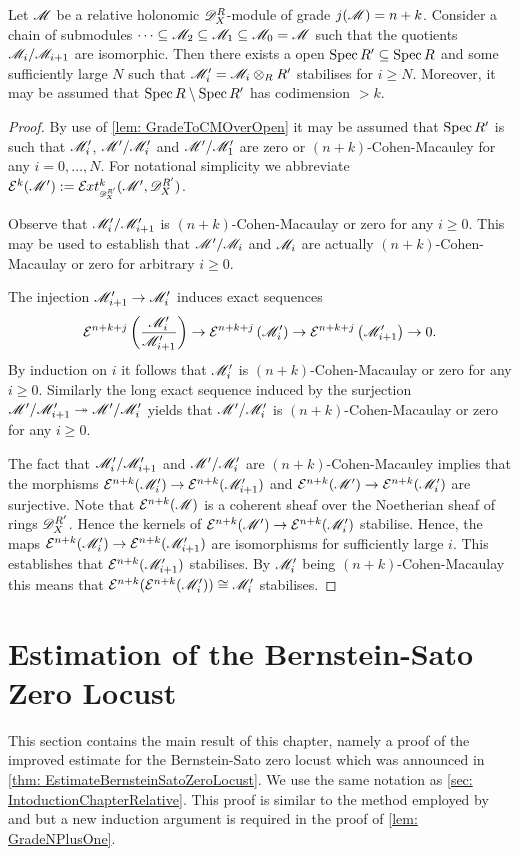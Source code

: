 \begin{lemma}\label{lem: StabilisationChains}
  Let $\mathscr{M}$ be a relative holonomic $\mathscr{D}_X^R$-module of grade $j(\mathscr{M}) = n+k$.
  Consider a chain of submodules $\cdots \subseteq \mathscr{M}_2\subseteq\mathscr{M}_1 \subseteq \mathscr{M}_0 = \mathscr{M} $
  such that the quotients $\mathscr{M}_i/\mathscr{M}_{i+1}$ are isomorphic.
  Then there exists a open $\operatorname{Spec} R' \subseteq \operatorname{Spec} R$ and some sufficiently large $N$ such that $\mathscr{M}_i' = \mathscr{M}_i\otimes_R R'$ stabilises for $i\geq N$. Moreover, it may be assumed that $\operatorname{Spec} R \setminus \operatorname{Spec} R'$ has codimension $>k$.
\end{lemma}
\begin{proof}
  By use of \cref{lem: GradeToCMOverOpen} it may be assumed that $\operatorname{Spec} R'$ is such that $\mathscr{M}_i'$, $\mathscr{M}'/\mathscr{M}_i'$ and $\mathscr{M}'/\mathscr{M}_1'$ are zero or $(n+k)$-Cohen-Macauley for any $i=0,\ldots,N$.
  For notational simplicity we abbreviate $\E^{k}(\M') :=\Ex{\D_X^{R'}}{k}(\M',\D_X^{R'})$.

  Observe that $ \mathscr{M}_i'/\mathscr{M}_{i+1}'$ is $(n+k)$-Cohen-Macaulay or zero for any $i\geq 0$.
  This may be used to establish that $\mathscr{M}'/\mathscr{M}_i$ and $\mathscr{M}_i$ are actually $(n+k)$-Cohen-Macaulay or zero for arbitrary $i\geq 0$.

  The injection $ \mathscr{M}_{i+1}'\to \mathscr{M}_i'$ induces exact sequences
  $$\mathcal{E}^{n+k+j}\left(\frac{\mathscr{M}_i'}{ \mathscr{M}_{i+1}'}\right) \to  \mathcal{E}^{n+k+j}\left(\mathscr{M}_i'\right) \to \mathcal{E}^{n+k +j}\left( \mathscr{M}_{i+1}'\right)\to 0.$$
  By induction on $i$ it follows that $\mathscr{M}_i'$ is $(n+k)$-Cohen-Macaulay or zero for any $i\geq 0$.
  Similarly the long exact sequence induced by the surjection $\mathscr{M}'/\mathscr{M}_{i+1}' \twoheadrightarrow \mathscr{M}'/\mathscr{M}_i'$ yields that $\mathscr{M}'/\mathscr{M}_i'$ is $(n+k)$-Cohen-Macaulay or zero for any $i\geq 0$.


  The fact that $\mathscr{M}_i'/\mathscr{M}_{i+1}'$ and $\mathscr{M}'/\mathscr{M}_{i}'$ are $(n+k)$-Cohen-Macauley implies that the morphisms $\mathcal{E}^{n+k}(\mathscr{M}_i') \to  \mathcal{E}^{n+k}(\mathscr{M}_{i+1}')$ and $\mathcal{E}^{n+k}(\mathscr{M}') \to \mathcal{E}^{n+k} (\mathscr{M}_i')$ are surjective.
  Note that $\mathcal{E}^{n+k}(\mathscr{M})$ is a coherent sheaf over the Noetherian sheaf of rings $\mathscr{D}_X^{R'}$.
  Hence the kernels of $\mathcal{E}^{n+k}(\mathscr{M}') \to \mathcal{E}^{n+k} (\mathscr{M}_i')$ stabilise.
  Hence, the maps $\mathcal{E}^{n+k}(\mathscr{M}_i') \to  \mathcal{E}^{n+k}(\mathscr{M}_{i+1}')$ are isomorphisms for sufficiently large $i$.
  This establishes that $\mathcal{E}^{n+k}(\mathscr{M}_{i+1}')$ stabilises.
  By $ \mathscr{M}_i'$ being $(n+k)$-Cohen-Macaulay this means that $\mathcal{E}^{n+k}(\mathcal{E}^{n+k}(\mathscr{M}_i')) \cong \mathscr{M}_i'$ stabilises.
\end{proof}
\section{Estimation of the Bernstein-Sato Zero Locust}
This section contains the main result of this chapter, namely a proof of the improved estimate for the Bernstein-Sato zero locust which was announced in \cref{thm: EstimateBernsteinSatoZeroLocust}.
We use the same notation as \cref{sec: IntoductionChapterRelative}.
This proof is similar to the method employed by \cite{lichtin1989poles} and \cite{kashiwara1976b} but a new induction argument is required in the proof of \cref{lem: GradeNPlusOne}.\\

